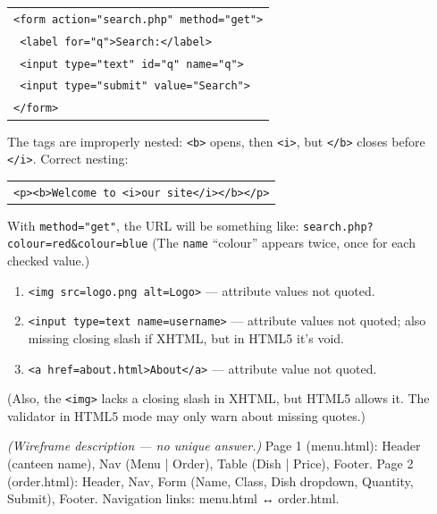 \documentclass[11pt]{article}
\begin{document}
\begin{corrige}[Exercise 1]
\begin{tabular}{@{}l@{}}
\texttt{\textless form action="search.php" method="get"\textgreater} \\
\texttt{  \textless label for="q"\textgreater Search:\textless/label\textgreater} \\
\texttt{  \textless input type="text" id="q" name="q"\textgreater} \\
\texttt{  \textless input type="submit" value="Search"\textgreater} \\
\texttt{\textless/form\textgreater}
\end{tabular}
\end{corrige}

\begin{corrige}[Exercise 2]
The tags are improperly nested: \texttt{<b>} opens, then \texttt{<i>}, but \texttt{</b>} closes before \texttt{</i>}.  Correct nesting:
\begin{tabular}{@{}l@{}}
\texttt{\textless p\textgreater\textless b\textgreater Welcome to \textless i\textgreater our site\textless/i\textgreater\textless/b\textgreater\textless/p\textgreater}
\end{tabular}
\end{corrige}

\begin{corrige}[Exercise 3]
With \texttt{method="get"}, the URL will be something like:
\texttt{search.php?colour=red\&colour=blue}
(The \texttt{name} “colour” appears twice, once for each checked value.)
\end{corrige}

\begin{corrige}[Exercise 4]
\begin{enumerate}
  \item \texttt{<img src=logo.png alt=Logo>} — attribute values not quoted.
  \item \texttt{<input type=text name=username>} — attribute values not quoted; also missing closing slash if XHTML, but in HTML5 it's void.
  \item \texttt{<a href=about.html>About</a>} — attribute value not quoted.
\end{enumerate}
(Also, the \texttt{<img>} lacks a closing slash in XHTML, but HTML5 allows it.  The validator in HTML5 mode may only warn about missing quotes.)
\end{corrige}

\begin{corrige}[Exercise 5]
\textit{(Wireframe description — no unique answer.)}
Page 1 (menu.html): Header (canteen name), Nav (Menu | Order), Table (Dish | Price), Footer.
Page 2 (order.html): Header, Nav, Form (Name, Class, Dish dropdown, Quantity, Submit), Footer.
Navigation links: menu.html ↔ order.html.
\end{corrige}
\end{document}
